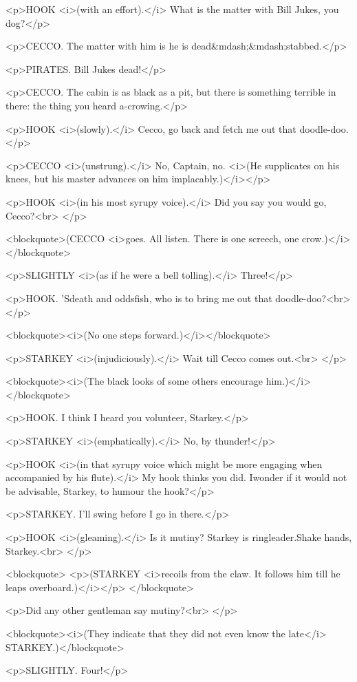 <p>HOOK <i>(with an effort).</i> What is the matter with Bill Jukes,
you dog?</p>

<p>CECCO. The matter with him is he is dead&mdash;&mdash;stabbed.</p>

<p>PIRATES. Bill Jukes dead!</p>

<p>CECCO. The cabin is as black as a pit, but there is something
terrible in there: the thing you heard a-crowing.</p>

<p>HOOK <i>(slowly).</i> Cecco, go back and fetch me out that
doodle-doo.</p>

<p>CECCO <i>(unstrung).</i> No, Captain, no. <i>(He supplicates on
his knees, but his master advances on him implacably.)</i></p>

<p>HOOK <i>(in his most syrupy voice).</i> Did you say you would go,
Cecco?<br>
</p>

<blockquote>(CECCO <i>goes. All listen. There is one screech, one
crow.)</i></blockquote>

<p>SLIGHTLY <i>(as if he were a bell tolling).</i> Three!</p>

<p>HOOK. 'Sdeath and oddsfish, who is to bring me out that
doodle-doo?<br>
</p>

<blockquote><i>(No one steps forward.)</i></blockquote>

<p>STARKEY <i>(injudiciously).</i> Wait till Cecco comes out.<br>
</p>

<blockquote><i>(The black looks of some others encourage
him.)</i></blockquote>

<p>HOOK. I think I heard you volunteer, Starkey.</p>

<p>STARKEY <i>(emphatically).</i> No, by thunder!</p>

<p>HOOK <i>(in that syrupy voice which might be more engaging when
accompanied by his flute).</i> My hook thinks you did. Iwonder if it
would not be advisable, Starkey, to humour the hook?</p>

<p>STARKEY. I'll swing before I go in there.</p>

<p>HOOK <i>(gleaming).</i> Is it mutiny? Starkey is ringleader.Shake
hands, Starkey.<br>
</p>

<blockquote>
<p>(STARKEY <i>recoils from the claw. It follows him till he leaps
overboard.)</i></p>
</blockquote>

<p>Did any other gentleman say mutiny?<br>
</p>

<blockquote><i>(They indicate that they did not even know the
late</i> STARKEY.)</blockquote>

<p>SLIGHTLY. Four!</p>

